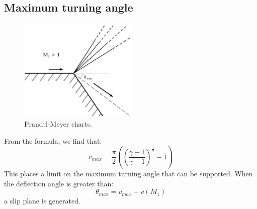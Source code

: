 \documentclass[class=report, crop=false, 12pt,a4paper]{standalone}
\begin{document}
\subsection{Maximum turning angle}
\begin{figure}[H]
    \centering
    \includegraphics[width = 0.5\textwidth]{../img/diagram27.png}
    \caption{Prandtl-Meyer charts.}
\end{figure}
From the formula, we find that:
\begin{equation}
    v_{max} = \frac{\pi}{2}\left(\left(\frac{\gamma + 1}{\gamma -1}\right)^{\frac{1}{2}} - 1\right)
\end{equation}
This places a limit on the maximum turning angle that can be supported. When the deflection angle is greater than:
\begin{equation}
    \theta_{max} = v_{max} - v\left(M_1\right)
\end{equation}
a slip plane is generated.
\end{document}
